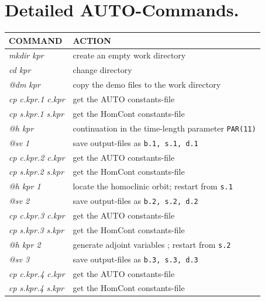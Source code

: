 \documentclass[12pt]{report}
\begin{document}
\section{ Detailed {\cal AUTO}-Commands.}
\begin{table}[htbp]
\begin{center}
\begin{tabular}{| l | l |}
\hline
  COMMAND  & ACTION \\
\hline
  {\it mkdir kpr} & create an empty work directory \\ 
  {\it cd kpr} & change directory \\
  {\it @dm kpr} & copy the demo files to the work directory \\
\hline
  {\it cp c.kpr.1 c.kpr} & get the AUTO constants-file \\ 
  {\it cp s.kpr.1 s.kpr} & get the HomCont constants-file \\ 
  {\it @h kpr} &  continuation in the time-length parameter {\tt PAR(11)} \\ 
  {\it @sv 1} & save output-files as {\tt b.1, s.1, d.1} \\ 
\hline
  {\it cp c.kpr.2 c.kpr} & get the AUTO constants-file \\ 
  {\it cp s.kpr.2 s.kpr} & get the HomCont constants-file \\ 
  {\it @h kpr 1} & locate the homoclinic orbit; restart from {\tt s.1} \\ 
  {\it @sv 2} & save output-files as {\tt b.2, s.2, d.2} \\ 
\hline
  {\it cp c.kpr.3 c.kpr} & get the AUTO constants-file \\ 
  {\it cp s.kpr.3 s.kpr} & get the HomCont constants-file \\ 
  {\it @h kpr 2} & generate adjoint variables  ; restart from {\tt s.2} \\ 
  {\it @sv 3} & save output-files as {\tt b.3, s.3, d.3} \\ 
\hline
  {\it cp c.kpr.4 c.kpr} & get the AUTO constants-file \\ 
  {\it cp s.kpr.4 s.kpr} & get the HomCont constants-file \\ 

\end{tabular}
\end{center}
\end{table}
\end{document}
